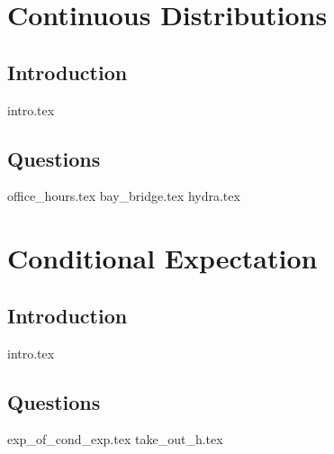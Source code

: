 \documentclass{exam}
\begin{document}
\section{Continuous Distributions}
\subsection{Introduction}
{intro.tex}
\subsection{Questions}
\begin{questions}
{office_hours.tex}
{bay_bridge.tex}
{hydra.tex}
\end{questions}

\section{Conditional Expectation}
\subsection{Introduction}
{intro.tex}
\subsection{Questions}
\begin{questions}
{exp_of_cond_exp.tex}
{take_out_h.tex}
\end{questions}
\end{document}
